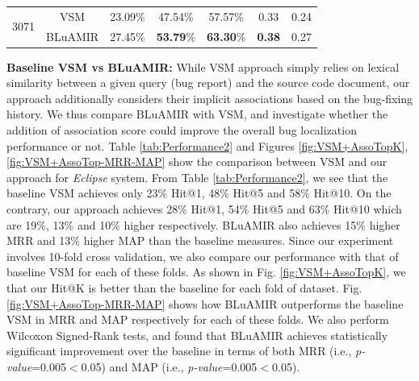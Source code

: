 \documentclass[conference]{IEEEtran}
\begin{document}
\begin{table}[!tb]
{\begin{tabular}{c|c|c|c|c|c|c}
			\multirow{2}{*}{3071}                                                                               & VSM & 23.09\% & 47.54\% & 57.57\% & 0.33 & 0.24 \\  \cline{2-7}   & BLuAMIR     & 27.45\%                                                 & \textbf{53.79}\%                                                 & \textbf{63.30}\%                                                  &   \textbf{0.38}  &  0.27    \\ 
			\hline
	\end{tabular}
	
    }
\vspace{-.5cm}
	\centering
\end{table}
 

\textbf{Baseline VSM vs BLuAMIR:} While VSM approach simply relies on lexical similarity between a given query (bug report) and the source code document, our approach additionally considers their implicit associations based on the bug-fixing history.
We thus compare BLuAMIR with VSM, and investigate whether the addition of association score could improve the overall bug localization performance or not. Table \ref{tab:Performance2} and Figures \ref{fig:VSM+AssoTopK}, \ref{fig:VSM+AssoTop-MRR-MAP} show the comparison between VSM and our approach for \emph{Eclipse} system. From Table \ref{tab:Performance2}, we see that the baseline VSM achieves only 23\% Hit@1, 48\% Hit@5 and 58\% Hit@10. On the contrary, our approach achieves 28\% Hit@1, 54\% Hit@5 and 63\% Hit@10 which are 19\%, 13\% and 10\% higher respectively. BLuAMIR also achieves 15\% higher MRR and 13\% higher MAP than the baseline measures. Since our experiment involves 10-fold cross validation, we also compare our performance with that of baseline VSM for each of these folds. As shown in Fig. \ref{fig:VSM+AssoTopK}, we that our Hit@K is better than the baseline for each fold of dataset. Fig. \ref{fig:VSM+AssoTop-MRR-MAP} shows how BLuAMIR outperforms the baseline VSM in MRR and MAP respectively for each of these folds. We also perform Wilcoxon Signed-Rank tests, and found that BLuAMIR achieves statistically significant improvement over the baseline in terms of both MRR (i.e., \emph{p-value}=0.005$<$0.05) and MAP (i.e., \emph{p-value}=0.005$<$0.05).

\end{document}
